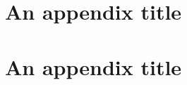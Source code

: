 \documentclass[../main.tex]{subfiles} %
\begin{document}

\begin{appendices}

\label{cha:Appendices}
	
	\chapter{An appendix title}
	
	\chapter{An appendix title}

\end{appendices}

\biblio
\end{document}
